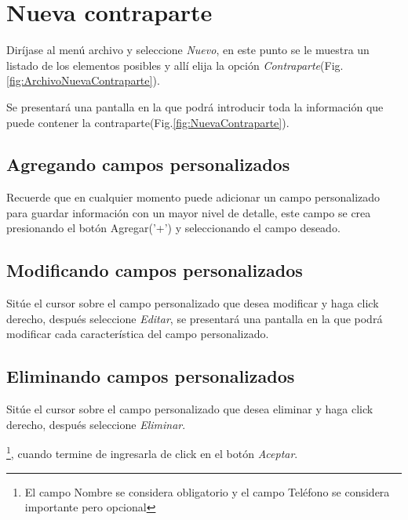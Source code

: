 \section{Nueva contraparte}
\label{sec:nuevaContraparte}
Dir\'ijase al men\'u archivo y seleccione \emph{Nuevo}, en este punto se le muestra un listado de los elementos posibles y
all\'i elija la opci\'on \emph{Contraparte}(Fig.\ref{fig:ArchivoNuevaContraparte}). 
  

Se presentar\'a una pantalla en la que podr\'a introducir toda la informaci\'on
que puede contener la contraparte(Fig.\ref{fig:NuevaContraparte}). 
  

\subsection{Agregando campos personalizados}
\label{sec:agregarCamposContraparte}
Recuerde que en cualquier momento puede adicionar un campo personalizado para guardar informaci\'on con un mayor nivel de detalle, este campo se crea presionando el bot\'on Agregar('+') y seleccionando el campo deseado.

\subsection{Modificando campos personalizados}
\label{sec:modificarCamposContraparte}
Sit\'ue el cursor sobre el campo personalizado que desea modificar y haga click derecho, despu\'es seleccione \emph{Editar},
se presentar\'a una pantalla en la que podr\'a modificar cada caracter\'istica
del campo personalizado.

\subsection{Eliminando campos personalizados}
\label{sec:eliminarCamposContraparte}
Sit\'ue el cursor sobre el campo personalizado que desea eliminar y haga click derecho, despu\'es seleccione \emph{Eliminar}.

\footnote{El campo Nombre se considera obligatorio y el campo Tel\'efono se
considera importante pero opcional},
cuando termine de ingresarla de click en el bot\'on \emph{Aceptar}.